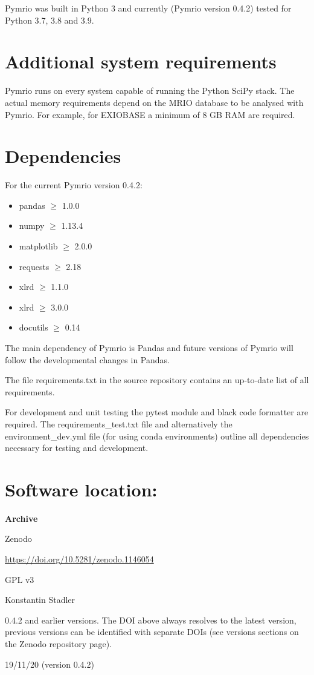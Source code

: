 \documentclass{jors}
\begin{document}
Pymrio was built in Python 3 and currently (Pymrio version 0.4.2) tested for Python 3.7, 3.8 and 3.9.


\section*{Additional system requirements}

Pymrio runs on every system capable of running the Python SciPy stack.
The actual memory requirements depend on the MRIO database to be analysed with Pymrio. For example, for EXIOBASE \cite{stadler2018_EXIOBASE} a minimum of 8 GB RAM are required. 

\section*{Dependencies}

For the current Pymrio version 0.4.2:

\begin{itemize}
    \item pandas $\ge$ 1.0.0
    \item numpy $\ge$ 1.13.4
    \item matplotlib $\ge$ 2.0.0
    \item requests $\ge$ 2.18
    \item xlrd $\ge$ 1.1.0 
     \item xlrd $\ge$ 3.0.0
    \item docutils $\ge$ 0.14 
\end{itemize}

The main dependency of Pymrio is Pandas and future versions of Pymrio will follow the developmental changes in Pandas.

The file requirements.txt in the source repository contains an up-to-date list of all requirements.

For development and unit testing the pytest module and black code formatter are required. The requirements\_test.txt file and alternatively the environment\_dev.yml file (for using conda environments) outline all dependencies necessary for testing and development.

\section*{Software location:}

{\bf Archive} 

\begin{description}[noitemsep,topsep=0pt]
	\item[Name:] Zenodo
    \item[Persistent identifier:] \url{https://doi.org/10.5281/zenodo.1146054}
	\item[Licence:] GPL v3
	\item[Publisher:]  Konstantin Stadler
    \item[Version published:] 0.4.2 and earlier versions. The DOI above always resolves to the latest version, previous versions can be identified with separate DOIs (see versions sections on the Zenodo repository page). 
    \item[Date published:] 19/11/20 (version 0.4.2)
\end{description}
\end{document}
